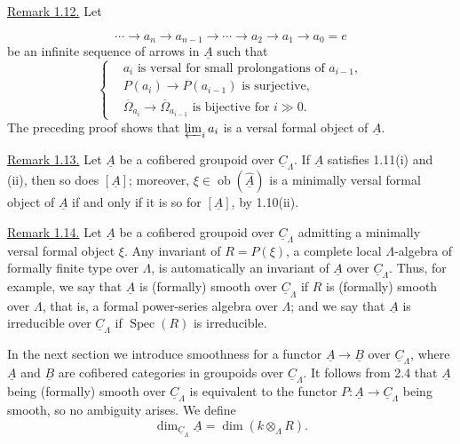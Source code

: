 \underline{Remark 1.12.} Let


\[
 \cdots\longrightarrow a_n\longrightarrow a_{n-1}
 \longrightarrow\cdots\longrightarrow a_2\longrightarrow a_1
 \longrightarrow a_0=e
\]
be an infinite sequence of arrows in $\underline A$ such that
\[
\left\{
\begin{aligned}
&a_i\text{ is versal for small prolongations of }a_{i-1},\\
&P(a_i)\longrightarrow P(a_{i-1})\text{ is surjective},\\
&\overline\Omega_{a_i}\longrightarrow
 \overline\Omega_{a_{i-1}}\text{ is bijective for }i\gg0.
\end{aligned}
\right.
\]
The preceding proof shows that $\varprojlim_i a_i$ is a versal formal
object of $\underline A$.

\underline{Remark 1.13.} Let $\underline A$ be a cofibered groupoid
over $\underline C_\Lambda$. If $\underline A$ satisfies 1.11(i) and
(ii), then so does $[\underline A]$; moreover,
$\xi\in\operatorname{ob}(\widehat{\underline A})$ is a minimally
versal formal object of $\underline A$ if and only if it is so for
$[\underline A]$, by 1.10(ii).

\underline{Remark 1.14.} Let $\underline A$ be a cofibered groupoid
over $\underline C_\Lambda$ admitting a minimally versal formal
object $\xi$. Any invariant of $R=P(\xi)$, a complete local
$\Lambda$-algebra of formally finite type over $\Lambda$, is
automatically an invariant of $\underline A$ over
$\underline C_\Lambda$. Thus, for example, we say that $\underline A$
is (formally) smooth over $\underline C_\Lambda$ if $R$ is
(formally) smooth over $\Lambda$, that is, a formal power-series
algebra over $\Lambda$; and we say that $\underline A$ is irreducible over
$\underline C_\Lambda$ if $\operatorname{Spec}(R)$ is irreducible.

In the next section we introduce smoothness for a functor
$\underline A\longrightarrow\underline B$ over
$\underline C_\Lambda$, where $\underline A$ and $\underline B$ are
cofibered categories in groupoids over $\underline C_\Lambda$.
It follows from 2.4 that $\underline A$ being (formally) smooth over
$\underline C_\Lambda$ is equivalent to the functor
$P:\underline A\longrightarrow\underline C_\Lambda$ being smooth,
so no ambiguity arises. We define
\[
 \dim_{\underline C_\Lambda}\underline A
   =\dim(k\otimes_\Lambda R).
\]

